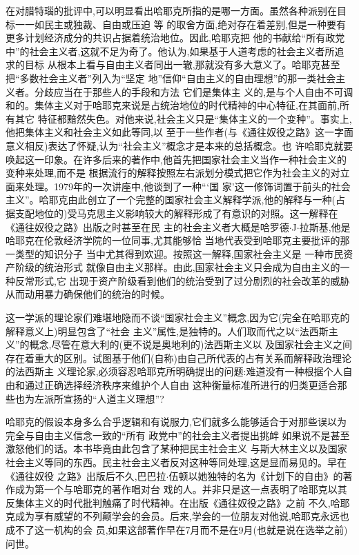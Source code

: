 ﻿\documentclass[12pt]{article}
\begin{document}
在对腊特瑙的批评中,可以明显看出哈耶克所指的是哪一方面。虽然各种派别在目标一一如民主或独裁、自由或压迫
等 \myrule 的取舍方面,绝对存在着差别,但是一种要有更多计划经济成分的共识占据着统治地位。因此,哈耶克把
他的书献给``所有政党中''的社会主义者,这就不足为奇了。他认为,如果基于人道考虑的社会主义者所追求的目标
从根本上看与自由主义者同出一辙,那就没有多大意义了。哈耶克甚至把``多数社会主义者''列入为``坚定
地''信仰``自由主义的自由理想''的那一类社会主义者。分歧应当在于那些人的手段和方法 \myrule 它们是集体主
义的,是与个人自由不可调和的。集体主义对于哈耶克来说是占统治地位的时代精神的中心特征,在其面前,所有其它
特征都黯然失色。对他来说,社会主义只是``集体主义的一个变种''。事实上,他把集体主义和社会主义如此等同,以
至于一些作者(与《通往奴役之路》这一字面意义相反)表达了怀疑,认为``社会主义''概念才是本来的总括概念。也
许哈耶克就要唤起这一印象。在许多后来的著作中,他首先把国家社会主义当作一种社会主义的变种来处理,而不是
根据流行的解释按照左右派划分模式把它作为社会主义的对立面来处理。1979年的一次讲座中,他谈到了一种``‘国
家’这一修饰词置于前头的社会主义''。哈耶克由此创立了一个完整的国家社会主义解释学派,他的解释与一种(占
据支配地位的)受马克思主义影响较大的解释形成了有意识的对照。这一解释在《通往奴役之路》出版之时甚至在民
主的社会主义者\myrule 大概是哈罗德$\cdot$J$\cdot$拉斯基,他是哈耶克在伦敦经济学院的一位同事,尤其能够恰
当地代表受到哈耶克主要批评的那一类型的知识分子 \myrule 当中尤其得到欢迎。按照这一解释,国家社会主义是
一种市民资产阶级的统治形式 \myrule 就像自由主义那样。由此,国家社会主义只会成为自由主义的一种反常形式,它
出现于资产阶级看到他们的统治受到了过分剧烈的社会改革的威胁从而动用暴力确保他们的统治的时候。

这一学派的理论家们难堪地隐而不谈``国家社会主义''概念,因为它(完全在哈耶克的解释意义上)明显包含了``社会
主义''属性,是独特的。人们取而代之以``法西斯主义''的概念,尽管在意大利的(更不说是奥地利的)法西斯主义以
及国家社会主义之间存在着重大的区别。试图基于他们(自称)由自己所代表的占有关系而解释政治理论的法西斯主
义理论家,必须容忍哈耶克所明确提出的问题:难道没有一种根据个人自由和通过正确选择经济秩序来维护个人自由
这种衡量标准所进行的归类更适合那些也为左派所宣扬的``人道主义理想''?

哈耶克的假设本身多么合乎逻辑和有说服力,它们就多么能够适合于对那些误以为完全与自由主义信念一致的``所有
政党中''的社会主义者提出挑衅 \myrule 如果说不是甚至激怒他们的话。本书毕竟由此包含了某种把民主社会主义
与斯大林主义以及国家社会主义等同的东西。民主社会主义者反对这种等同处理,这是显而易见的。早在《通往奴役
之路》出版后不久,巴巴拉$\cdot$伍顿以她独特的名为《计划下的自由》的著作成为第一个与哈耶克的著作唱对台
戏的人。并非只是这一点表明了哈耶克以其反集体主义的时代批判触痛了时代精神。在出版《通往奴役之路》之前
不久,哈耶克成为享有威望的不列颠学会的会员。后来,学会的一位朋友对他说,哈耶克永远也成不了这一机构的会
员,如果这部著作早在7月而不是在9月(也就是说在选举之前)问世。
\end{document}
